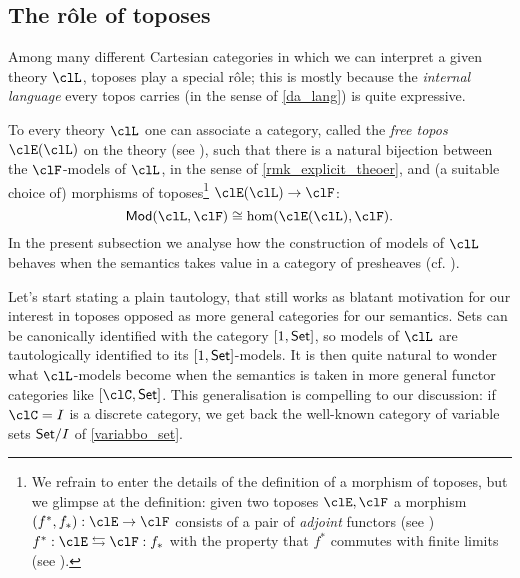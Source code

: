 \subsection{The r\^ole of toposes}
Among many different Cartesian categories in which we can interpret a given theory $\clL$, toposes play a special r\^ole; this is mostly because the \emph{internal language} every topos carries (in the sense of \autoref{da_lang}) is quite expressive.

To every theory $\clL$ one can associate a category, called the \emph{free topos} $\clE(\clL)$ on the theory (see \cite{lambek1988introduction}), such that there is a natural bijection between the $\clF$-models of $\clL$, in the sense of  \autoref{rmk_explicit_theoer}, and (a suitable choice of) morphisms of toposes\footnote{We refrain to enter the details of the definition of a morphism of toposes, but we glimpse at the definition: given two toposes $\clE,\clF$ a morphism $(f^*,f_*): \clE \to \clF$ consists of a pair of \emph{adjoint} functors (see \cite[3]{Bor1}) $f^*: \clE \leftrightarrows \clF: f_*$ with the property that $f^*$ commutes with finite limits (see \cite[2.8.2]{Bor1}).} $\clE(\clL) \to \clF$:
\[\cate{Mod}(\clL, \clF) \cong \hom(\clE(\clL), \clF).\]
In the present subsection we analyse how the construction of models of $\clL$ behaves when the semantics takes value in a category of presheaves (cf. \cite[??]{Bor1}).

Let's start stating a plain tautology, that still works as blatant motivation for our interest in toposes opposed as more general categories for our semantics. Sets can be canonically identified with the category $[1,\mathsf{Set}]$, so models of $\clL$ are tautologically identified to its $[1,\mathsf{Set}]$-models. It is then quite natural to wonder what $\clL$-models become when the semantics is taken in more general functor categories like $[\clC,\Set]$. This generalisation is compelling to our discussion: if $\clC=I$ is a discrete category, we get back the well-known category of variable sets $\mathsf{Set}/I$ of \autoref{variabbo_set}.

